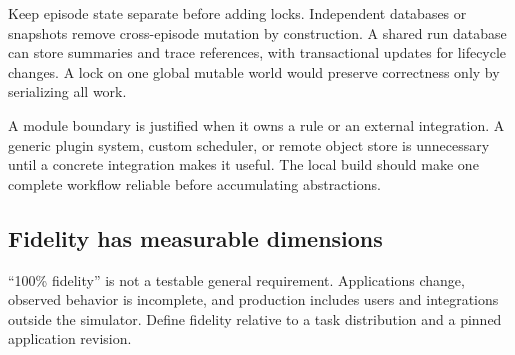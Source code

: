 \documentclass[
  11pt,
  letterpaper,
]{article}
\begin{document}
Keep episode state separate before adding locks. Independent databases
or snapshots remove cross-episode mutation by construction. A shared run
database can store summaries and trace references, with transactional
updates for lifecycle changes. A lock on one global mutable world would
preserve correctness only by serializing all work.

A module boundary is justified when it owns a rule or an external
integration. A generic plugin system, custom scheduler, or remote object
store is unnecessary until a concrete integration makes it useful. The
local build should make one complete workflow reliable before
accumulating abstractions.

\subsection{Fidelity has measurable
dimensions}\label{fidelity-has-measurable-dimensions}

``100\% fidelity'' is not a testable general requirement. Applications
change, observed behavior is incomplete, and production includes users
and integrations outside the simulator. Define fidelity relative to a
task distribution and a pinned application revision.
\end{document}
